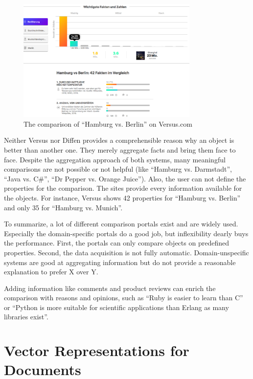 \begin{figure}[ht]
    \centering
	\includegraphics[width=0.8\textwidth]{images/ds-sys/versus}
	\caption{The comparison of \enquote{Hamburg vs. Berlin} on Versus.com}
		\label{img:versus}
\end{figure}

Neither Versus nor Diffen provides a comprehensible reason why an object is better than another one. They merely aggregate facts and bring them face to face. Despite the aggregation approach of both systems, many meaningful comparisons are not possible or not helpful (like \enquote{Hamburg vs. Darmstadt}, \enquote{Java vs. C\#}, \enquote{Dr Pepper vs. Orange Juice}).
Also, the user can not define the properties for the comparison. The sites provide every information available for the objects. For instance, Versus shows 42 properties for \enquote{Hamburg vs. Berlin} and only 35 for \enquote{Hamburg vs. Munich}.
\newline

To summarize, a lot of different comparison portals exist and are widely used. Especially the domain-specific portals do a good job, but inflexibility dearly buys the performance. First, the portals can only compare objects on predefined properties. Second, the data acquisition is not fully automatic. Domain-unspecific systems are good at aggregating information but do not provide a reasonable explanation to prefer X over Y.

Adding information like comments and product reviews can enrich the comparison with reasons and opinions, such as \enquote{Ruby is easier to learn than C} or \enquote{Python is more suitable for scientific applications than Erlang as many libraries exist}.

\FloatBarrier

\section{Vector Representations for Documents}

